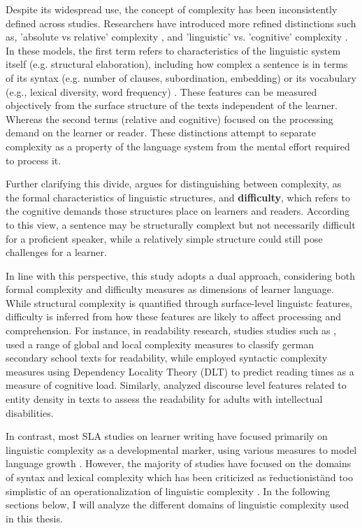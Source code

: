 Despite its widespread use, the concept of complexity has been inconsistently defined across studies. Researchers
have introduced more refined distinctions such as, 'absolute vs relative'
complexity
\citet{Miestamo2008, Butle2012}, and
'linguistic' vs. 'cognitive' complexity \cite{housen2009}. In these models, the first term refers to characteristics
of the linguistic system itself (e.g. structural elaboration), including how complex a sentence is in terms of its
syntax (e.g. number of clauses, subordination, embedding) or its vocabulary (e.g., lexical diversity, word frequency)
. These features can be measured objectively from the surface structure of the texts independent of the learner.
Whereas the second terms (relative and cognitive) focused on the processing demand on the learner or reader.
These distinctions attempt to separate complexity as a
property of the language system from the mental effort required to process it.

Further clarifying this divide, \citet{Pallotti2015} argues for distinguishing between complexity, as the formal
characteristics of linguistic structures, and \textbf{difficulty}, which refers to the cognitive demands those
structures place on learners and readers. According to this view, a sentence may be structurally complext but not
necessarily difficult for a proficient speaker, while a relatively simple structure could still pose challenges for
a learner.

 In line with this perspective, this study adopts a dual approach, considering both formal complexity and
difficulty measures as dimensions of learner language. While structural complexity is quantified through
surface-level linguistc features, difficulty is inferred from how these features are likely to affect processing and
comprehension. For instance, in readability research, studies studies such as \citet{Berendes2018}, used a range of
global and local complexity measures to classify german secondary school texts for readability, while
\citet{shain2016}employed syntactic complexity measures using Dependency Locality Theory (DLT) to predict reading
times as a measure of cognitive load. Similarly, \citet{Feng2009} analyzed discourse level features related to
entity density in texts to assess the readability for adults with intellectual disabilities. %

In contrast, most SLA studies on learner writing have focused primarily on linguistic complexity as a developmental
marker, using various measures to model language growth
\cite{Lu2010,Lu2011,Vyatkina2012,weiss2019,Iwashita2006,Wolfe1998, Ortega2003,NorrisOrtega2009}. However,
the majority of studies have focused on the domains of syntax and lexical complexity which has been criticized
as \"reductionist\" and too simplistic of an operationalization of linguistic complexity \cite{Butle2012}. In the
following sections below, I
will analyze the different domains of linguistic complexity used in this thesis.

